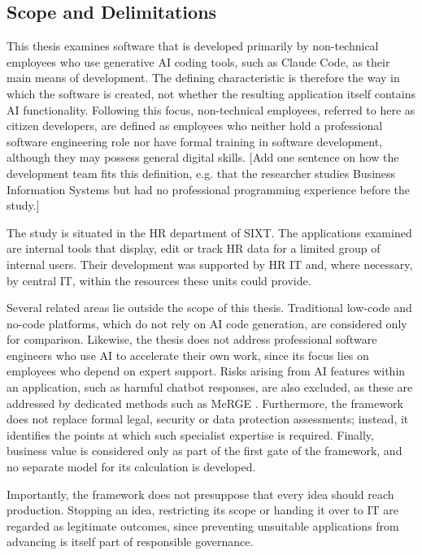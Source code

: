 \documentclass[10pt,a4paper]{article}
\begin{document}
\subsection{Scope and Delimitations}
\label{sec:scope}

This thesis examines software that is developed primarily by
non-technical employees who use generative AI coding tools, such as
Claude Code, as their main means of development. The defining
characteristic is therefore the way in which the software is created,
not whether the resulting application itself contains AI functionality.
Following this focus, non-technical employees, referred to here as
citizen developers, are defined as employees who neither hold a
professional software engineering role nor have formal training in
software development, although they may possess general digital
skills. [Add one sentence on how the development team fits this
definition, e.g. that the researcher studies Business Information
Systems but had no professional programming experience before the
study.]

The study is situated in the HR department of SIXT. The applications
examined are internal tools that display, edit or track HR data for a
limited group of internal users. Their development was supported by
HR IT and, where necessary, by central IT, within the resources these
units could provide.

Several related areas lie outside the scope of this thesis. Traditional
low-code and no-code platforms, which do not rely on AI code
generation, are considered only for comparison. Likewise, the thesis
does not address professional software engineers who use AI to
accelerate their own work, since its focus lies on employees who
depend on expert support. Risks arising from AI features within an
application, such as harmful chatbot responses, are also excluded, as
these are addressed by dedicated methods such as MeRGE
\parencite{fetzer2026}. Furthermore, the framework does not replace
formal legal, security or data protection assessments; instead, it
identifies the points at which such specialist expertise is required.
Finally, business value is considered only as part of the first gate
of the framework, and no separate model for its calculation is
developed.

Importantly, the framework does not presuppose that every idea should
reach production. Stopping an idea, restricting its scope or handing it
over to IT are regarded as legitimate outcomes, since preventing
unsuitable applications from advancing is itself part of responsible
governance.
\end{document}
